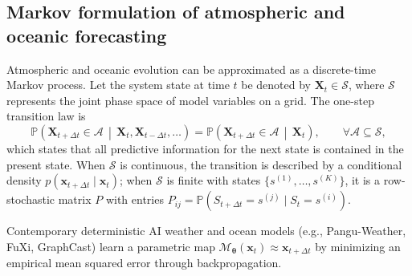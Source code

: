 
\subsection{Markov formulation of atmospheric and oceanic forecasting}
\label{subsec:markov_formulation}

Atmospheric and oceanic evolution can be approximated as a discrete-time Markov process.
Let the system state at time $t$ be denoted by $\mathbf{X}_t \in \mathcal{S}$,
where $\mathcal{S}$ represents the joint phase space of model variables on a grid.
The one-step transition law is
\begin{equation}
    \mathbb{P}\!\left(\mathbf{X}_{t+\Delta t} \in \mathcal{A}\,\middle|\,\mathbf{X}_t, \mathbf{X}_{t-\Delta t}, \ldots \right)
    = \mathbb{P}\!\left(\mathbf{X}_{t+\Delta t} \in \mathcal{A}\,\middle|\,\mathbf{X}_t \right),
    \qquad \forall \mathcal{A} \subseteq \mathcal{S},
    \label{eq:markov_property}
\end{equation}
which states that all predictive information for the next state is contained in the present state.
When $\mathcal{S}$ is continuous, the transition is described by a conditional density
$p(\mathbf{x}_{t+\Delta t}\mid \mathbf{x}_t)$; when $\mathcal{S}$ is finite with states
$\{s^{(1)},\ldots,s^{(K)}\}$, it is a row-stochastic matrix $P$ with entries
$P_{ij}=\mathbb{P}(S_{t+\Delta t}=s^{(j)}\mid S_t=s^{(i)})$.

Contemporary deterministic AI weather and ocean models (e.g., Pangu-Weather, FuXi, GraphCast)
learn a parametric map $\mathcal{M}_{\boldsymbol{\theta}}(\mathbf{x}_t)\approx \mathbf{x}_{t+\Delta t}$
by minimizing an empirical mean squared error through backpropagation.

